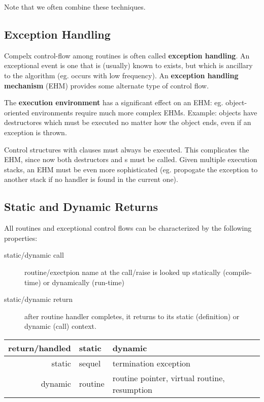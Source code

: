 \documentclass[12pt]{article}
\begin{document}
Note that we often combine these techniques.

\subsection{Exception Handling}
Compelx control-flow among routines is often called {\bf exception handling}. An exceptional event is one that is (usually) known to exists, but which is ancillary to the algorithm (eg. occurs with low frequency). An {\bf exception handling mechanism} (EHM) provides some alternate type of control flow.

The {\bf execution environment} has a significant effect on an EHM: eg. object-oriented environments require much more complex EHMs. Example: objects have destructores which must be executed no matter how the object ends, even if an exception is thrown.

Control structures with  clauses must always be executed. This complicates the EHM, since now both destructors and s must be called. Given multiple execution stacks, an EHM must be even more sophisticated (eg. propogate the exception to another stack if no handler is found in the current one).

\subsection{Static and Dynamic Returns}
All routines and exceptional control flows can be characterized by the following properties:
\begin{description}
\item[static/dynamic call] routine/exectpion name at the call/raise is looked up statically (compile-time) or dynamically (run-time)
\item[static/dynamic return] after routine handler completes, it returns to its static (definition) or dynamic (call) context.
\end{description}

\begin{table}[ht]
\centering
\begin{tabular}{r|ll}
  return/handled & static  & dynamic \\ \hline
  static         & sequel  & termination exception \\
  dynamic        & routine & routine pointer, virtual routine, resumption \\ \hline
  \end{tabular}
\end{table}
\end{document}
